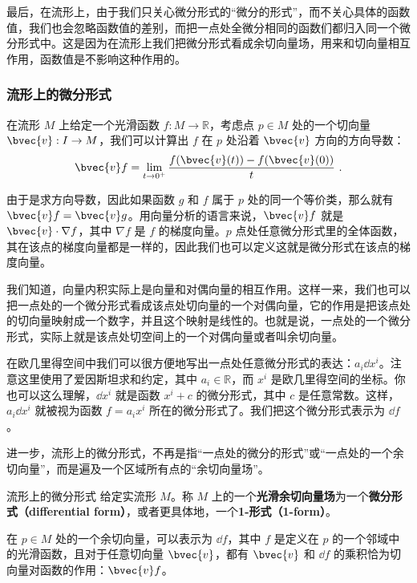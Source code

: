 最后，在流形上，由于我们只关心微分形式的“微分的形式”，而不关心具体的函数值，我们也会忽略函数值的差别，而把一点处全微分相同的函数们都归入同一个微分形式中。这是因为在流形上我们把微分形式看成余切向量场，用来和切向量相互作用，函数值是不影响这种作用的。

\subsubsection{流形上的微分形式}

在流形 $M$ 上给定一个光滑函数 $f:M\rightarrow \mathbb{R}$，考虑点 $p\in M$ 处的一个切向量 $\bvec{v}:I\rightarrow M$，我们可以计算出 $f$ 在 $p$ 处沿着 $\bvec{v}$ 方向的方向导数：
\begin{equation}
\bvec{v}f=\lim\limits_{t\rightarrow 0^+}\frac{f(\bvec{v}(t))-f(\bvec{v}(0))}{t}~.
\end{equation}

由于是求方向导数，因此如果函数 $g$ 和 $f$ 属于 $p$ 处的同一个等价类，那么就有 $\bvec{v}f=\bvec{v}g$。用向量分析的语言来说，$\bvec{v}f$ 就是 $\bvec{v}\cdot\nabla f$，其中 $\nabla f$ 是 $f$ 的梯度向量。$p$ 点处任意微分形式里的全体函数，其在该点的梯度向量都是一样的，因此我们也可以定义这就是微分形式在该点的梯度向量。

我们知道，向量内积实际上是向量和对偶向量的相互作用。这样一来，我们也可以把一点处的一个微分形式看成该点处切向量的一个对偶向量，它的作用是把该点处的切向量映射成一个数字，并且这个映射是线性的。也就是说，一点处的一个微分形式，实际上就是该点处切空间上的一个对偶向量或者叫余切向量。

在欧几里得空间中我们可以很方便地写出一点处任意微分形式的表达：$a_i\dd x^i$。注意这里使用了爱因斯坦求和约定，其中 $a_i\in\mathbb{R}$，而 $x^i$ 是欧几里得空间的坐标。你也可以这么理解，$\dd x^i$ 就是函数 $x^i+c$ 的微分形式，其中 $c$ 是任意常数。这样，$a_i\dd x^i$ 就被视为函数 $f=a_ix^i$ 所在的微分形式了。我们把这个微分形式表示为 $\dd f$。

进一步，流形上的微分形式，不再是指“一点处的微分的形式”或“一点处的一个余切向量”，而是遍及一个区域所有点的“余切向量场”。

\begin{definition}{流形上的微分形式}
给定实流形 $M$。称 $M$ 上的一个\textbf{光滑余切向量场}为一个\textbf{微分形式（differential form）}，或者更具体地，一个\textbf{1-形式（1-form）}。

在 $p\in M$ 处的一个余切向量，可以表示为 $\dd f$，其中 $f$ 是定义在 $p$ 的一个邻域中的光滑函数，且对于任意切向量 $\bvec{v}$，都有 $\bvec{v}$ 和 $\dd f$ 的乘积恰为切向量对函数的作用：$\bvec{v}f$。
\end{definition}

